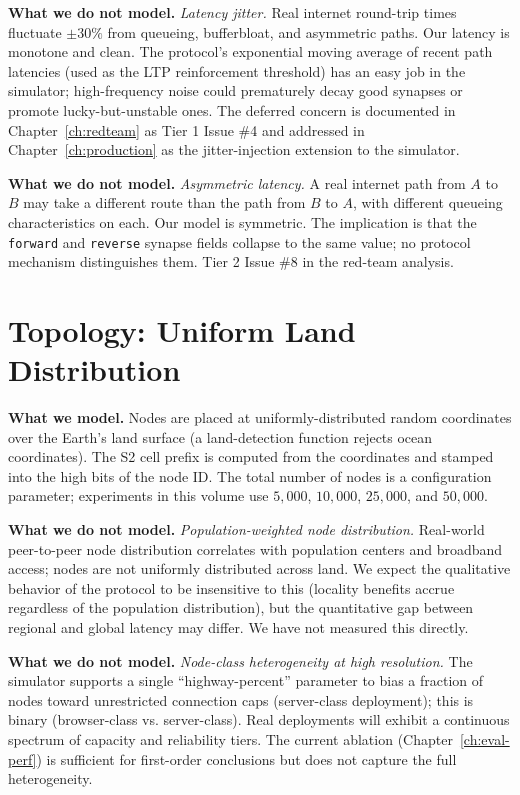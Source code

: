 \documentclass[twoside,nobib]{tufte-book}
\begin{document}
\textbf{What we do not model.} \emph{Latency jitter.} Real
internet round-trip times fluctuate $\pm 30\%$ from queueing,
bufferbloat, and asymmetric paths. Our latency is monotone and
clean. The protocol's exponential moving average of recent path
latencies (used as the LTP reinforcement threshold) has an easy
job in the simulator; high-frequency noise could prematurely
decay good synapses or promote lucky-but-unstable ones. The
deferred concern is documented in Chapter~\ref{ch:redteam} as
Tier 1 Issue \#4 and addressed in Chapter~\ref{ch:production} as
the jitter-injection extension to the simulator.

\textbf{What we do not model.} \emph{Asymmetric latency.} A real
internet path from $A$ to $B$ may take a different route than
the path from $B$ to $A$, with different queueing characteristics
on each. Our model is symmetric. The implication is that the
\texttt{forward} and \texttt{reverse} synapse fields collapse to
the same value; no protocol mechanism distinguishes them. Tier 2
Issue \#8 in the red-team analysis.

\section{Topology: Uniform Land Distribution}

\textbf{What we model.} Nodes are placed at uniformly-distributed
random coordinates over the Earth's land surface (a land-detection
function rejects ocean coordinates). The S2 cell prefix is
computed from the coordinates and stamped into the high bits of
the node ID. The total number of nodes is a configuration
parameter; experiments in this volume use $5{,}000$, $10{,}000$,
$25{,}000$, and $50{,}000$.

\textbf{What we do not model.} \emph{Population-weighted node
distribution.} Real-world peer-to-peer node distribution
correlates with population centers and broadband access; nodes
are not uniformly distributed across land. We expect the
qualitative behavior of the protocol to be insensitive to this
(locality benefits accrue regardless of the population
distribution), but the quantitative gap between regional and
global latency may differ. We have not measured this directly.

\textbf{What we do not model.} \emph{Node-class heterogeneity at
high resolution.} The simulator supports a single
``highway-percent'' parameter to bias a fraction of nodes toward
unrestricted connection caps (server-class deployment); this is
binary (browser-class vs. server-class). Real deployments will
exhibit a continuous spectrum of capacity and reliability tiers.
The current ablation (Chapter~\ref{ch:eval-perf}) is sufficient
for first-order conclusions but does not capture the full
heterogeneity.
\end{document}
